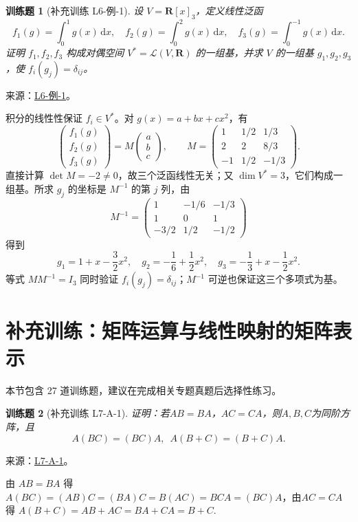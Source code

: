 \documentclass[12pt,fontset=fandol]{ctexart}
\newtheorem{exercise}{训练题}[section]
\begin{document}
\begin{exercise}[补充训练 L6-例-1]\label{prob:L6-例-1}
设 $V=\mathbf R[x]_3$，定义线性泛函
\[f_1(g)=\int_0^1g(x)\,\mathrm dx,\quad f_2(g)=\int_0^2g(x)\,\mathrm dx,\quad f_3(g)=\int_0^{-1}g(x)\,\mathrm dx.\]
证明 $f_1,f_2,f_3$ 构成对偶空间 $V^*=\mathcal L(V,\mathbf R)$ 的一组基，并求 $V$ 的一组基 $g_1,g_2,g_3$，使 $f_i(g_j)=\delta_{ij}$。
\end{exercise}
\noindent 来源：\href{https://github.com/yhwu-is/Linear-Algebra-Left-Undone/blob/new/%E8%AE%B2%E4%B9%89/%E4%B8%93%E9%A2%98/6%20%E5%AF%B9%E5%81%B6%E7%A9%BA%E9%97%B4.tex}{L6-例-1}。
\begin{solve}
积分的线性性保证 $f_i\in V^*$。对 $g(x)=a+bx+cx^2$，有
\[\begin{pmatrix}f_1(g)\\f_2(g)\\f_3(g)\end{pmatrix}=M\begin{pmatrix}a\\b\\c\end{pmatrix},\qquad
M=\begin{pmatrix}1&1/2&1/3\\2&2&8/3\\-1&1/2&-1/3\end{pmatrix}.\]
直接计算 $\det M=-2\ne0$，故三个泛函线性无关；又 $\dim V^*=3$，它们构成一组基。所求 $g_j$ 的坐标是 $M^{-1}$ 的第 $j$ 列，由
\[M^{-1}=\begin{pmatrix}1&-1/6&-1/3\\1&0&1\\-3/2&1/2&-1/2\end{pmatrix}\]
得到
\[g_1=1+x-\frac32x^2,\quad g_2=-\frac16+\frac12x^2,\quad g_3=-\frac13+x-\frac12x^2.\]
等式 $MM^{-1}=I_3$ 同时验证 $f_i(g_j)=\delta_{ij}$；$M^{-1}$ 可逆也保证这三个多项式为基。
\end{solve}

\section{补充训练：矩阵运算与线性映射的矩阵表示}

本节包含 27 道训练题，建议在完成相关专题真题后选择性练习。

\begin{exercise}[补充训练 L7-A-1]\label{prob:L7-A-1}
证明：若$AB=BA$，$AC=CA$，则$A,B,C$为同阶方阵，且
        \[A(BC)=(BC)A,\enspace A(B+C)=(B+C)A.\]
\end{exercise}
\noindent 来源：\href{https://github.com/yhwu-is/Linear-Algebra-Left-Undone/blob/new/%E8%AE%B2%E4%B9%89/%E4%B8%93%E9%A2%98/7%20%E7%BA%BF%E6%80%A7%E6%98%A0%E5%B0%84%E7%9F%A9%E9%98%B5%E8%A1%A8%E7%A4%BA%E4%B8%8E%E7%9F%A9%E9%98%B5%E8%BF%90%E7%AE%97%E5%9F%BA%E7%A1%80.tex}{L7-A-1}。
\begin{solve}
由 $AB=BA$ 得 $A(BC)=(AB)C=(BA)C=B(AC)=BCA=(BC)A$，由$AC=CA$ 得 $A(B+C)=AB+AC=BA+CA=B+C$.
\end{solve}
\end{document}
